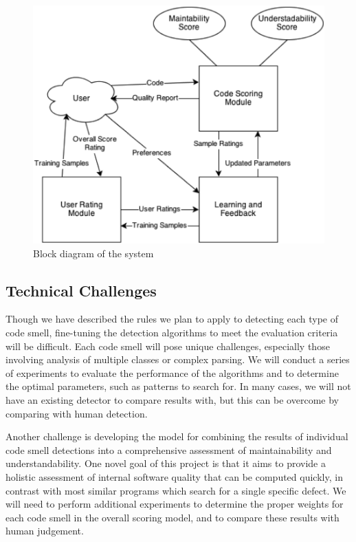 \documentclass{sig-alternate}
\begin{document}
\begin{figure}[htb!]
	\begin{center}
		\includegraphics[width=0.9\linewidth]{block_diagram}
	\end{center}
	\vspace{-12pt}
	\caption{Block diagram of the system}
	\label{fig:some_graph}
\end{figure}

\subsection{Technical Challenges}
\label{subsec:tech_challenges}
Though we have described the rules we plan to apply to detecting each type of code smell, fine-tuning the detection algorithms to meet the evaluation criteria will be difficult. Each code smell will pose unique challenges, especially those involving analysis of multiple classes or complex parsing. We will conduct a series of experiments to evaluate the performance of the algorithms and to determine the optimal parameters, such as patterns to search for. In many cases, we will not have an existing detector to compare results with, but this can be overcome by comparing with human detection. 

Another challenge is developing the model for combining the results of individual code smell detections into a comprehensive assessment of maintainability and understandability. One novel goal of this project is that it aims to provide a holistic assessment of internal software quality that can be computed quickly, in contrast with most similar programs which search for a single specific defect. We will need to perform additional experiments to determine the proper weights for each code smell in the overall scoring model, and to compare these results with human judgement.
\end{document}
